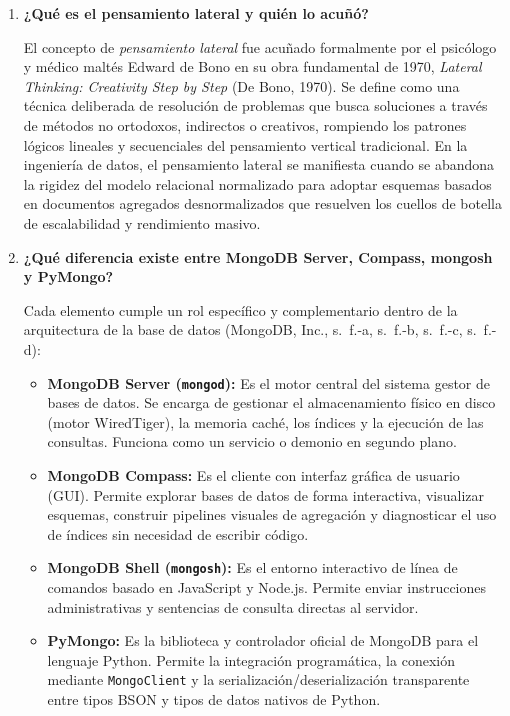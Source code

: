 \documentclass[12pt,a4paper]{article}
\begin{document}
\begin{enumerate}
    \item \textbf{¿Qué es el pensamiento lateral y quién lo acuñó?}
    
    El concepto de \textit{pensamiento lateral} fue acuñado formalmente por el psicólogo y médico maltés Edward de Bono en su obra fundamental de 1970, \textit{Lateral Thinking: Creativity Step by Step} (De Bono, 1970). Se define como una técnica deliberada de resolución de problemas que busca soluciones a través de métodos no ortodoxos, indirectos o creativos, rompiendo los patrones lógicos lineales y secuenciales del pensamiento vertical tradicional. En la ingeniería de datos, el pensamiento lateral se manifiesta cuando se abandona la rigidez del modelo relacional normalizado para adoptar esquemas basados en documentos agregados desnormalizados que resuelven los cuellos de botella de escalabilidad y rendimiento masivo.

    \item \textbf{¿Qué diferencia existe entre MongoDB Server, Compass, mongosh y PyMongo?}
    
    Cada elemento cumple un rol específico y complementario dentro de la arquitectura de la base de datos (MongoDB, Inc., s.~f.-a, s.~f.-b, s.~f.-c, s.~f.-d):
    \begin{itemize}
        \item \textbf{MongoDB Server (\texttt{mongod}):} Es el motor central del sistema gestor de bases de datos. Se encarga de gestionar el almacenamiento físico en disco (motor WiredTiger), la memoria caché, los índices y la ejecución de las consultas. Funciona como un servicio o demonio en segundo plano.
        \item \textbf{MongoDB Compass:} Es el cliente con interfaz gráfica de usuario (GUI). Permite explorar bases de datos de forma interactiva, visualizar esquemas, construir pipelines visuales de agregación y diagnosticar el uso de índices sin necesidad de escribir código.
        \item \textbf{MongoDB Shell (\texttt{mongosh}):} Es el entorno interactivo de línea de comandos basado en JavaScript y Node.js. Permite enviar instrucciones administrativas y sentencias de consulta directas al servidor.
        \item \textbf{PyMongo:} Es la biblioteca y controlador oficial de MongoDB para el lenguaje Python. Permite la integración programática, la conexión mediante \texttt{MongoClient} y la serialización/deserialización transparente entre tipos BSON y tipos de datos nativos de Python.
    \end{itemize}


\end{enumerate}
\end{document}
